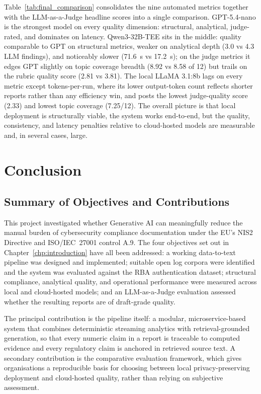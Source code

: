 \documentclass[]{UCD_CS_FYP_Report}
\begin{document}
Table~\ref{tab:final_comparison} consolidates the nine automated metrics together with the LLM-as-a-Judge headline scores into a single comparison. GPT-5.4-nano is the strongest model on every quality dimension: structural, analytical, judge-rated, and dominates on latency. Qwen3-32B-TEE sits in the middle: quality comparable to GPT on structural metrics, weaker on analytical depth (3.0 vs 4.3 LLM findings), and noticeably slower (71.6~s vs 17.2~s); on the judge metrics it edges GPT slightly on topic coverage breadth (8.92 vs 8.58 of 12) but trails on the rubric quality score (2.81 vs 3.81). The local LLaMA 3.1:8b lags on every metric except tokens-per-run, where its lower output-token count reflects shorter reports rather than any efficiency win, and posts the lowest judge-quality score (2.33) and lowest topic coverage (7.25/12). The overall picture is that local deployment is structurally viable, the system works end-to-end, but the quality, consistency, and latency penalties relative to cloud-hosted models are measurable and, in several cases, large.

\chapter{Conclusion}
\label{sec:conclusion}
\section{Summary of Objectives and Contributions}
\label{sec:conclusion_summary}

This project investigated whether Generative AI can meaningfully reduce the manual burden of cybersecurity compliance documentation under the EU's NIS2 Directive\cite{NIS2Directive2023} and ISO/IEC~27001 control A.9\cite{ISO27001A9}. The four objectives set out in Chapter~\ref{chp:introduction} have all been addressed: a working data-to-text pipeline was designed and implemented; suitable open log corpora were identified and the system was evaluated against the RBA authentication dataset; structural compliance, analytical quality, and operational performance were measured across local and cloud-hosted models; and an LLM-as-a-Judge evaluation assessed whether the resulting reports are of draft-grade quality.

The principal contribution is the pipeline itself: a modular, microservice-based system that combines deterministic streaming analytics with retrieval-grounded generation, so that every numeric claim in a report is traceable to computed evidence and every regulatory claim is anchored in retrieved source text. A secondary contribution is the comparative evaluation framework, which gives organisations a reproducible basis for choosing between local privacy-preserving deployment and cloud-hosted quality, rather than relying on subjective assessment.
\end{document}
